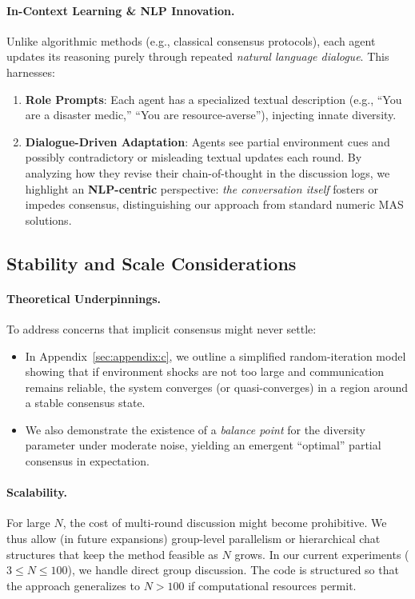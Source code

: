 \paragraph{In-Context Learning \& NLP Innovation.}
Unlike algorithmic methods (e.g., classical consensus protocols), each agent updates its reasoning purely through repeated \emph{natural language dialogue}. This harnesses:
\begin{enumerate}[itemsep=1pt, parsep=1pt, leftmargin=*]
    \item \textbf{Role Prompts}: Each agent has a specialized textual description (e.g., “You are a disaster medic,” “You are resource-averse”), injecting innate diversity.
    \item \textbf{Dialogue-Driven Adaptation}: Agents see partial environment cues and possibly contradictory or misleading textual updates each round. By analyzing how they revise their chain-of-thought in the discussion logs, we highlight an \textbf{NLP-centric} perspective: \emph{the conversation itself} fosters or impedes consensus, distinguishing our approach from standard numeric MAS solutions.
\end{enumerate}

\subsection{Stability and Scale Considerations}
\label{ssec:stability-scale}
\paragraph{Theoretical Underpinnings.}
To address concerns that implicit consensus might never settle:
\begin{itemize}
    \item In Appendix~\ref{sec:appendix:c}, we outline a simplified random-iteration model showing that if environment shocks are not too large and communication remains reliable, the system converges (or quasi-converges) in a region around a stable consensus state. 
    \item We also demonstrate the existence of a \emph{balance point} for the diversity parameter under moderate noise, yielding an emergent “optimal” partial consensus in expectation.
\end{itemize}

\paragraph{Scalability.}
For large $N$, the cost of multi-round discussion might become prohibitive. We thus allow (in future expansions) group-level parallelism or hierarchical chat structures that keep the method feasible as $N$ grows. In our current experiments ($3\le N \le100$), we handle direct group discussion. The code is structured so that the approach generalizes to $N>100$ if computational resources permit.

